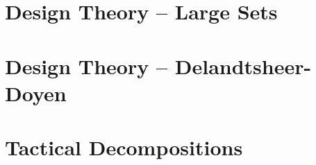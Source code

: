 \bigskip
\clearpage


\section{Design Theory -- Large Sets}
\label{sec:large:sets}









\bigskip
\clearpage
\section{Design Theory -- Delandtsheer-Doyen}
\label{sec:design:DD}









\bigskip
\clearpage


\section{Tactical Decompositions}
\label{sec:tactical:decompositions}








\bigskip
\clearpage

